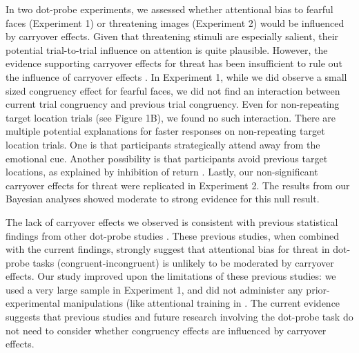 \documentclass{article}
\begin{document}
{	In two dot-probe experiments, we assessed whether attentional bias to fearful faces (Experiment 1) or threatening images (Experiment 2) would be influenced by carryover effects. Given that threatening stimuli are especially salient, their potential trial-to-trial influence on attention is quite plausible. However, the evidence supporting carryover effects for threat has been insufficient to rule out the influence of carryover effects \autocite{Gladwin2019a}\autocite{Hill2016}. In Experiment 1, while we did observe a small sized congruency effect for fearful faces, we did not find an interaction between current trial congruency and previous trial congruency. Even for non-repeating target location trials (see Figure 1B), we found no such interaction. There are multiple potential explanations for faster responses on non-repeating target location trials. One is that participants strategically attend away from the emotional cue. Another possibility is that participants avoid previous target locations, as explained by inhibition of return \autocite{Posner1985}. Lastly, our non-significant carryover effects for threat were replicated in Experiment 2. The results from our Bayesian analyses showed moderate to strong evidence for this null result.



	The lack of carryover effects we observed is consistent with previous statistical findings from other dot-probe studies \autocite{Gladwin2017}\autocite{Hill2016}\autocite{Hill2016}. These previous studies, when combined with the current findings, strongly suggest that attentional bias for threat in dot-probe tasks (congruent-incongruent) is unlikely to be moderated by carryover effects. Our study improved upon the limitations of these previous studies: we used a very large sample in Experiment 1, and did not administer any prior-experimental manipulations (like attentional training in \autocite{Hill2016}. The current evidence suggests that previous studies and future research involving the dot-probe task do not need to consider whether congruency effects are influenced by carryover effects.



}
\end{document}
